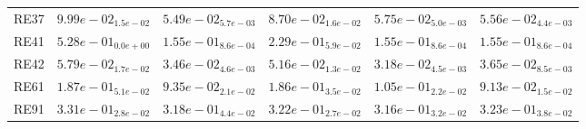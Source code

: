 \documentclass{article}
\begin{document}
\begin{table}
\begin{scriptsize}
\begin{tabular}{llllll}
RE37 & $  9.99e-02_{ 1.5e-02}$ & \cellcolor{gray95}$  5.49e-02_{ 5.7e-03}$ & $  8.70e-02_{ 1.6e-02}$ & $  5.75e-02_{ 5.0e-03}$ & \cellcolor{gray25}$  5.56e-02_{ 4.4e-03}$ \\
RE41 & $  5.28e-01_{ 0.0e+00}$ & \cellcolor{gray95}$  1.55e-01_{ 8.6e-04}$ & $  2.29e-01_{ 5.9e-02}$ & \cellcolor{gray25}$  1.55e-01_{ 8.6e-04}$ & $  1.55e-01_{ 8.6e-04}$ \\
RE42 & $  5.79e-02_{ 1.7e-02}$ & \cellcolor{gray25}$  3.46e-02_{ 4.6e-03}$ & $  5.16e-02_{ 1.3e-02}$ & \cellcolor{gray95}$  3.18e-02_{ 4.5e-03}$ & $  3.65e-02_{ 8.5e-03}$ \\
RE61 & $  1.87e-01_{ 5.1e-02}$ & \cellcolor{gray25}$  9.35e-02_{ 2.1e-02}$ & $  1.86e-01_{ 3.5e-02}$ & $  1.05e-01_{ 2.2e-02}$ & \cellcolor{gray95}$  9.13e-02_{ 1.5e-02}$ \\
RE91 & $  3.31e-01_{ 2.8e-02}$ & \cellcolor{gray25}$  3.18e-01_{ 4.4e-02}$ & $  3.22e-01_{ 2.7e-02}$ & \cellcolor{gray95}$  3.16e-01_{ 3.2e-02}$ & $  3.23e-01_{ 3.8e-02}$ \\
\hline
\end{tabular}
\end{scriptsize}
\end{table}
\end{document}
